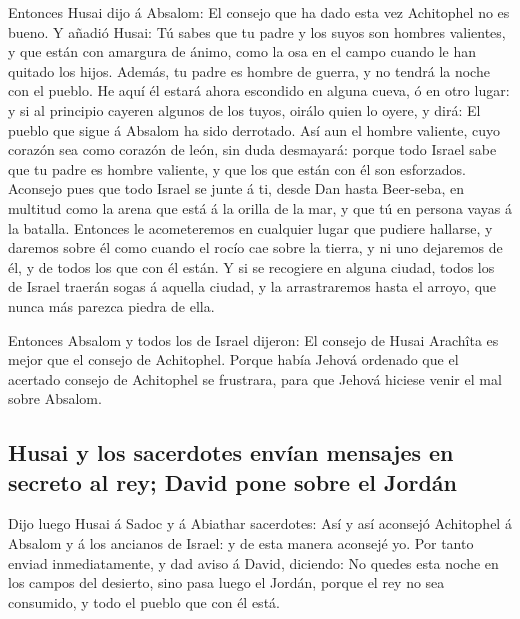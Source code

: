  Entonces Husai dijo á Absalom: El consejo que ha dado esta
vez Achitophel no es bueno.  Y añadió Husai: Tú sabes que tu
padre y los suyos son hombres valientes, y que están con amargura de
ánimo, como la osa en el campo cuando le han quitado los hijos. Además,
tu padre es hombre de guerra, y no tendrá la noche con el pueblo.
 He aquí él estará ahora escondido en alguna cueva, ó en
otro lugar: y si al principio cayeren algunos de los tuyos, oirálo quien
lo oyere, y dirá: El pueblo que sigue á Absalom ha sido derrotado.
 Así aun el hombre valiente, cuyo corazón sea como corazón
de león, sin duda desmayará: porque todo Israel sabe que tu padre es
hombre valiente, y que los que están con él son esforzados.
 Aconsejo pues que todo Israel se junte á ti, desde Dan
hasta Beer-seba, en multitud como la arena que está á la orilla de la
mar, y que tú en persona vayas á la batalla.  Entonces le
acometeremos en cualquier lugar que pudiere hallarse, y daremos sobre él
como cuando el rocío cae sobre la tierra, y ni uno dejaremos de él, y de
todos los que con él están.  Y si se recogiere en alguna
ciudad, todos los de Israel traerán sogas á aquella ciudad, y la
arrastraremos hasta el arroyo, que nunca más parezca piedra de ella.

 Entonces Absalom y todos los de Israel dijeron: El consejo
de Husai Arachîta es mejor que el consejo de Achitophel. Porque había
Jehová ordenado que el acertado consejo de Achitophel se frustrara, para
que Jehová hiciese venir el mal sobre Absalom.

\hypertarget{husai-y-los-sacerdotes-envuxedan-mensajes-en-secreto-al-rey-david-pone-sobre-el-jorduxe1n}{%
\subsection{Husai y los sacerdotes envían mensajes en secreto al rey;
David pone sobre el
Jordán}\label{husai-y-los-sacerdotes-envuxedan-mensajes-en-secreto-al-rey-david-pone-sobre-el-jorduxe1n}}

 Dijo luego Husai á Sadoc y á Abiathar sacerdotes: Así y
así aconsejó Achitophel á Absalom y á los ancianos de Israel: y de esta
manera aconsejé yo.  Por tanto enviad inmediatamente, y dad
aviso á David, diciendo: No quedes esta noche en los campos del
desierto, sino pasa luego el Jordán, porque el rey no sea consumido, y
todo el pueblo que con él está.


